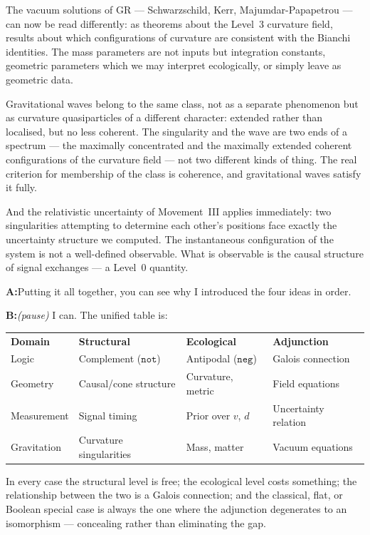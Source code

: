 \documentclass[11pt]{article}
\newcommand{\A}{\medskip\noindent\textbf{A:}\quad}
\newcommand{\B}{\medskip\noindent\textbf{B:}\quad}
\begin{document}
The vacuum solutions of GR --- Schwarzschild, Kerr,
Majumdar-Papapetrou --- can now be read differently: as theorems
about the Level~3 curvature field, results about which configurations
of curvature are consistent with the Bianchi identities. The mass
parameters are not inputs but integration constants, geometric
parameters which we may interpret ecologically, or simply leave as
geometric data.

Gravitational waves belong to the same class, not as a separate
phenomenon but as curvature quasiparticles of a different character:
extended rather than localised, but no less coherent. The singularity
and the wave are two ends of a spectrum --- the maximally concentrated
and the maximally extended coherent configurations of the curvature
field --- not two different kinds of thing. The real criterion for
membership of the class is coherence, and gravitational waves satisfy
it fully.

And the relativistic uncertainty of Movement~III applies immediately:
two singularities attempting to determine each other's positions face
exactly the uncertainty structure we computed. The instantaneous
configuration of the system is not a well-defined observable. What is
observable is the causal structure of signal exchanges --- a Level~0
quantity.

\A Putting it all together, you can see why I introduced the four
ideas in order.

\B \textit{(pause)} I can. The unified table is:

\medskip
\begin{center}
\begin{tabular}{llll}
\textbf{Domain} & \textbf{Structural} & \textbf{Ecological} &
  \textbf{Adjunction} \\[4pt]
Logic & Complement ($\texttt{not}$) & Antipodal ($\texttt{neg}$) &
  Galois connection \\
Geometry & Causal/cone structure & Curvature, metric &
  Field equations \\
Measurement & Signal timing & Prior over $v$, $d$ &
  Uncertainty relation \\
Gravitation & Curvature singularities & Mass, matter &
  Vacuum equations \\
\end{tabular}
\end{center}

\medskip
In every case the structural level is free; the ecological level costs
something; the relationship between the two is a Galois connection;
and the classical, flat, or Boolean special case is always the one
where the adjunction degenerates to an isomorphism --- concealing
rather than eliminating the gap.
\end{document}
